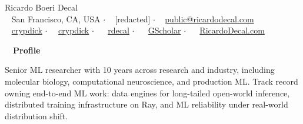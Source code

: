 \documentclass[a4paper,12pt]{article}
\newcommand{\resheading}[1]{{\hspace{-9pt} \colorbox{mygrey}{\begin{minipage}{\textwidth}{\textmd{~~\large \textbf{#1} \vphantom{p\^{E}}}}\end{minipage}}\vspace{6pt}} }
\begin{document}
    \begin{center}
    {\Huge Ricardo Boeri Decal}
        \\
        {\small \faMapMarker~ San Francisco, CA, USA $\cdot$ \faPhone~ [redacted] $\cdot$ \faEnvelope~ \href{mailto:public@ricardodecal.com}{public@ricardodecal.com}  \\ \faGithubAlt~ \href{https://github.com/crypdick}{crypdick} $\cdot$~\faStackOverflow~  \href{https://stackoverflow.com/users/4212158/crypdick}{crypdick} $\cdot$ ~\faLinkedin~ \href{https://www.linkedin.com/in/rdecal/}{rdecal} $\cdot$ ~\faGraduationCap~ \href{https://scholar.google.com/citations?user=4ODJ78oAAAAJ}{GScholar} $\cdot$ ~\faHome~  \href{https://www.ricardodecal.com}{RicardoDecal.com}} 
    \end{center}

    \resheading{Profile}

    Senior ML researcher with 10 years across research and industry, including molecular biology, computational neuroscience, and production ML. Track record owning end-to-end ML work: data engines for long-tailed open-world inference, distributed training infrastructure on Ray, and ML reliability under real-world distribution shift.\\


%
\end{document}
